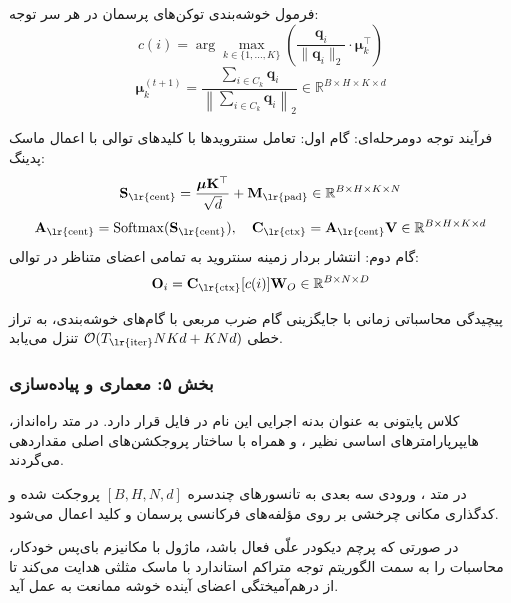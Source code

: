 فرمول خوشه‌بندی توکن‌های پرسمان در هر سر توجه:
\begin{equation}
c(i) = \arg\max_{k \in \{1, \dots, K\}} \left( \frac{\mathbf{q}_i}{\|\mathbf{q}_i\|_2} \cdot \boldsymbol{\mu}_k^\top \right)
\end{equation}
\begin{equation}
\boldsymbol{\mu}_k^{(t+1)} = \frac{\sum_{i \in C_k} \mathbf{q}_i}{\left\|\sum_{i \in C_k} \mathbf{q}_i\right\|_2} \in \mathbb{R}^{B \times H \times K \times d}
\end{equation}

فرآیند توجه دومرحله‌ای:
گام اول: تعامل سنترویدها با کلیدهای توالی با اعمال ماسک پدینگ:
\begin{equation}
\mathbf{S}_{\text{\lr{cent}}} = \frac{\boldsymbol{\mu} \mathbf{K}^\top}{\sqrt{d}} + \mathbf{M}_{\text{\lr{pad}}} \in \mathbb{R}^{B \times H \times K \times N}
\end{equation}
\begin{equation}
\mathbf{A}_{\text{\lr{cent}}} = \operatorname{Softmax}(\mathbf{S}_{\text{\lr{cent}}}), \quad \mathbf{C}_{\text{\lr{ctx}}} = \mathbf{A}_{\text{\lr{cent}}} \mathbf{V} \in \mathbb{R}^{B \times H \times K \times d}
\end{equation}
گام دوم: انتشار بردار زمینه سنتروید به تمامی اعضای متناظر در توالی:
\begin{equation}
\mathbf{O}_i = \mathbf{C}_{\text{\lr{ctx}}}[c(i)] \mathbf{W}_O \in \mathbb{R}^{B \times N \times D}
\end{equation}

پیچیدگی محاسباتی زمانی با جایگزینی گام ضرب مربعی با گام‌های خوشه‌بندی، به تراز خطی $\mathcal{O}(T_{\text{\lr{iter}}} N K d + K N d)$ تنزل می‌یابد.

\subsubsection*{بخش ۵: معماری و پیاده‌سازی }
کلاس پایتونی  به عنوان بدنه اجرایی این نام در فایل  قرار دارد. در متد راه‌انداز، هایپرپارامترهای اساسی نظیر ،  و  همراه با ساختار پروجکشن‌های اصلی مقداردهی می‌گردند.

در متد ، ورودی سه بعدی به تانسورهای چندسره $[B, H, N, d]$ پروجکت شده و کدگذاری مکانی چرخشی  بر روی مؤلفه‌های فرکانسی پرسمان و کلید اعمال می‌شود.

در صورتی که پرچم دیکودر علّی  فعال باشد، ماژول با مکانیزم بای‌پس خودکار، محاسبات را به سمت الگوریتم توجه متراکم استاندارد با ماسک مثلثی هدایت می‌کند تا از درهم‌آمیختگی اعضای آینده خوشه ممانعت به عمل آید.

